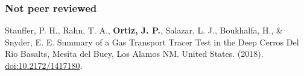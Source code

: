 \documentclass[11pt, letterpaper]{article}
\newcommand{\years}[1]{\marginnote{\scriptsize #1}}
\begin{document}
\subsubsection*{Not peer reviewed}
%
\years{2018}Stauffer, P. H., Rahn, T. A., \textbf{Ortiz, J. P.}, Salazar, L.
J., Boukhalfa, H., \& Snyder, E. E. Summary of a Gas Transport Tracer Test in
the Deep Cerros Del Rio Basalts, Mesita del Buey, Los Alamos NM. United States.
(2018). \href{https://www.osti.gov/servlets/purl/1417180}{doi:10.2172/1417180}.
\LosAlamosNationalLabOOOOSummaryofaGasTranspo %
%

\hypersetup{linkcolor=black,citecolor=blue,filecolor=black,urlcolor=blue} 
\end{document}
